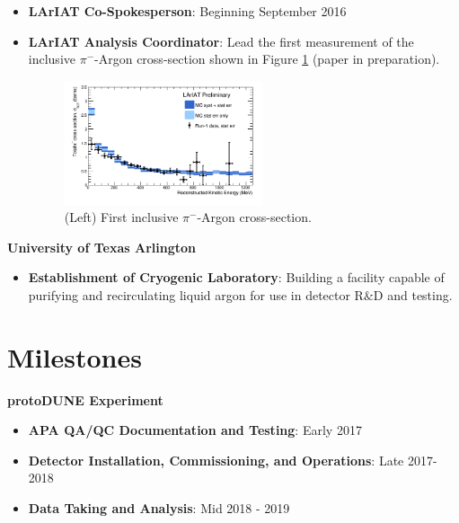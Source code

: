 \begin{itemize}[noitemsep,nolistsep]
\item{\textbf{LArIAT Co-Spokesperson}}: Beginning September 2016

\item{\textbf{LArIAT Analysis Coordinator}}: Lead the first measurement of the inclusive $\pi^{-}$-Argon cross-section shown in Figure \ref{fig:LArIATCrossSection} (paper in preparation).

\begin{figure}[htb]
\centering
\includegraphics[width=0.55\textwidth]{images/LArIATCrossSection.png}
\caption[]{(Left) First inclusive $\pi^{-}$-Argon cross-section.}
\label{fig:LArIATCrossSection}
\end{figure}


\end{itemize}

\noindent\textbf{University of Texas Arlington}

\begin{itemize}[noitemsep,nolistsep]
\item{\textbf{Establishment of Cryogenic Laboratory}}: Building a facility capable of purifying and recirculating liquid argon for use in detector R$\&$D and testing.
\end{itemize}

\section*{\textbf{Milestones}}
\noindent\textbf{protoDUNE Experiment}
\begin{itemize}[noitemsep,nolistsep]
\item{\textbf{APA QA/QC Documentation and Testing}}: Early 2017
\item{\textbf{Detector Installation, Commissioning, and Operations}}: Late 2017-2018
\item{\textbf{Data Taking and Analysis}}: Mid 2018 - 2019
\end{itemize}

